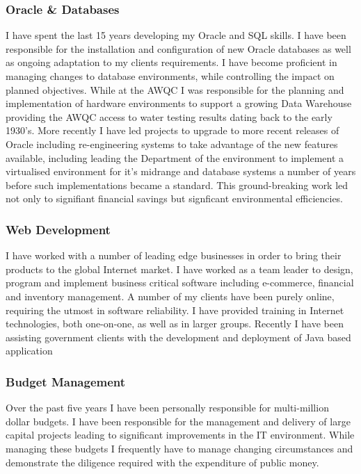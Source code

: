 \documentclass[]{friggeri-cv} %
\begin{document}
\subsubsection*{Oracle \& Databases}
I have spent the last 15 years developing my Oracle and SQL skills. I have been responsible for the installation and configuration of new Oracle databases as well as ongoing adaptation to my clients requirements. I have become proficient in managing changes to database environments, while controlling the impact on planned objectives. While at the AWQC I was responsible for the planning and implementation of hardware environments to support a growing Data Warehouse providing the AWQC access to water testing results dating back to the early 1930’s. More recently I have led projects to upgrade to more recent releases of Oracle including re-engineering systems to take advantage of the new features available, including leading the Department of the environment to implement a virtualised environment for it's midrange and database systems a number of years before such implementations became a standard. This ground-breaking work led not only to signifiant financial savings but signficant environmental efficiencies.

\subsubsection*{Web Development}
I have worked with a number of leading edge businesses in order to bring their products to the global Internet market. I have worked as a team leader to design, program and implement business critical software including e-commerce, financial and inventory management. A number of my clients have been purely online, requiring the utmost in software reliability. I have provided training in Internet technologies, both one-on-one, as well as in larger groups. Recently I have been assisting government clients with the development and deployment of Java based application

\subsubsection*{Budget Management}
Over the past five years I have been personally responsible for multi-million dollar budgets. I have been responsible for the management and delivery of large capital projects leading to significant improvements in the IT environment. While managing these budgets I frequently have to manage changing circumstances and demonstrate the diligence required with the expenditure of public money.
\end{document}
